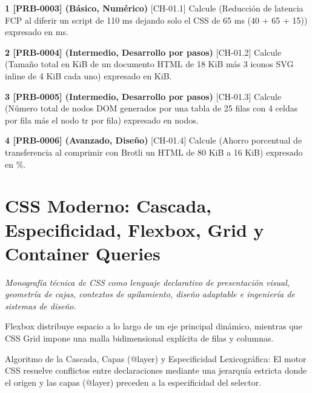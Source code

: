 \documentclass{book}
\begin{document}
\begin{tcolorbox}[title={Ejercicios}, studiumworked, breakable]

\noindent\textbf{1 [PRB-0003] (Básico, Numérico)}
[CH-01.1] Calcule (Reducción de latencia FCP al diferir un script de 110 ms dejando solo el CSS de 65 ms (40 + 65 + 15)) expresado en ms.

\noindent\textbf{2 [PRB-0004] (Intermedio, Desarrollo por pasos)}
[CH-01.2] Calcule (Tamaño total en KiB de un documento HTML de 18 KiB más 3 iconos SVG inline de 4 KiB cada uno) expresado en KiB.

\noindent\textbf{3 [PRB-0005] (Intermedio, Desarrollo por pasos)}
[CH-01.3] Calcule (Número total de nodos DOM generados por una tabla de 25 filas con 4 celdas por fila más el nodo tr por fila) expresado en nodos.

\noindent\textbf{4 [PRB-0006] (Avanzado, Diseño)}
[CH-01.4] Calcule (Ahorro porcentual de transferencia al comprimir con Brotli un HTML de 80 KiB a 16 KiB) expresado en \%.
\end{tcolorbox}

\chapter{CSS Moderno: Cascada, Especificidad, Flexbox, Grid y Container Queries}
\label{chap:ch-02}

\noindent\textit{Monografía técnica de CSS como lenguaje declarativo de presentación visual, geometría de cajas, contextos de apilamiento, diseño adaptable e ingeniería de sistemas de diseño.}

\begin{tcolorbox}[title={Consejo}, studiumtip, breakable]

Flexbox distribuye espacio a lo largo de un eje principal dinámico, mientras que CSS Grid impone una malla bidimensional explícita de filas y columnas.
\end{tcolorbox}

\begin{tcolorbox}[title={Definición}, studiumdef, breakable]

Algoritmo de la Cascada, Capas (@layer) y Especificidad Lexicográfica: El motor CSS resuelve conflictos entre declaraciones mediante una jerarquía estricta donde el origen y las capas (@layer) preceden a la especificidad del selector.
\end{tcolorbox}
\end{document}
